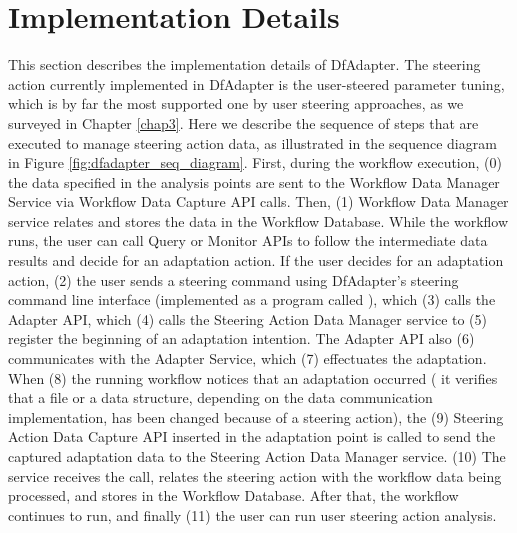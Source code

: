 \section{Implementation Details}
\label{dfadapter-implementation-details}

This section describes the implementation details of DfAdapter. The steering action currently implemented in DfAdapter is the user-steered parameter tuning, which is by far the most supported one by user steering approaches, as we surveyed in Chapter \ref{chap3}.
Here we describe the sequence of steps that are executed to manage steering action data, as illustrated in the sequence diagram in Figure \ref{fig:dfadapter_seq_diagram}.
First, during the workflow execution, (0) the data
specified in the analysis points are sent to the Workflow Data Manager Service via
Workflow Data Capture API calls.
Then, (1) Workflow Data Manager service relates and stores
the data in the Workflow Database.
While the workflow
runs, the user can call Query or Monitor APIs to follow the
intermediate data results and decide for an adaptation action.
If the user
decides for an adaptation action,
(2) the user sends a steering command
using DfAdapter's steering command line interface (implemented as a program called ), which (3) calls the
Adapter API,
which (4) calls the Steering Action Data Manager service
to (5) register the beginning of an adaptation intention.
The Adapter API also (6)
communicates with the Adapter Service, which (7)  effectuates the adaptation.
When (8) the running
workflow notices that an adaptation occurred (\eg{} it verifies
that a file or a data structure, depending on the data communication
implementation, has been changed because of a steering action), the (9)
Steering Action Data Capture API inserted in the adaptation point is
called to send the captured adaptation data to the Steering Action Data Manager service.
(10) The service receives the call, relates the steering action with the workflow data being processed, and stores in the Workflow Database. 
After that, the workflow
continues to run, and finally
(11) the user can run user steering action analysis.

